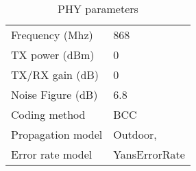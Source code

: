 
\begin{table}[t]
\centering
\renewcommand{\arraystretch}{1.2}
\caption{PHY parameters \label{tab:phy parameters}}
\begin{tabular}{ll}
\hline
Frequency (Mhz)                & 868 \\
TX power (dBm)                 & 0    \\
TX/RX gain (dB)                & 0     \\
Noise Figure (dB)              & 6.8      \\  
Coding method                  & BCC \\
Propagation model              & Outdoor, \cite{globecom2017} \\ %
Error rate model               & YansErrorRate \\
\hline
\end{tabular}
\end{table}



